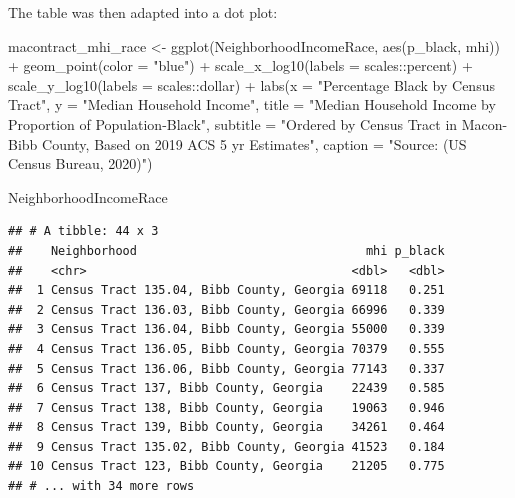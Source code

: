 \documentclass[
]{article}
\newenvironment{Shaded}{\begin{snugshade}}{\end{snugshade}}
\newcommand{\AttributeTok}[1]{\textcolor[rgb]{0.77,0.63,0.00}{#1}}
\newcommand{\FunctionTok}[1]{\textcolor[rgb]{0.00,0.00,0.00}{#1}}
\newcommand{\NormalTok}[1]{#1}
\newcommand{\OtherTok}[1]{\textcolor[rgb]{0.56,0.35,0.01}{#1}}
\newcommand{\SpecialCharTok}[1]{\textcolor[rgb]{0.00,0.00,0.00}{#1}}
\newcommand{\StringTok}[1]{\textcolor[rgb]{0.31,0.60,0.02}{#1}}
\begin{document}
The table was then adapted into a dot plot:

\begin{Shaded}
\begin{Highlighting}[]
\NormalTok{macontract\_mhi\_race }\OtherTok{\textless{}{-}} \FunctionTok{ggplot}\NormalTok{(NeighborhoodIncomeRace, }\FunctionTok{aes}\NormalTok{(p\_black, mhi)) }\SpecialCharTok{+} \FunctionTok{geom\_point}\NormalTok{(}\AttributeTok{color =} \StringTok{"blue"}\NormalTok{) }\SpecialCharTok{+} 
\FunctionTok{scale\_x\_log10}\NormalTok{(}\AttributeTok{labels =}\NormalTok{ scales}\SpecialCharTok{::}\NormalTok{percent) }\SpecialCharTok{+}
\FunctionTok{scale\_y\_log10}\NormalTok{(}\AttributeTok{labels =}\NormalTok{ scales}\SpecialCharTok{::}\NormalTok{dollar) }\SpecialCharTok{+} 
\FunctionTok{labs}\NormalTok{(}\AttributeTok{x =} \StringTok{"Percentage Black by Census Tract"}\NormalTok{, }\AttributeTok{y =} \StringTok{"Median Household Income"}\NormalTok{,}
     \AttributeTok{title =} \StringTok{"Median Household Income by Proportion of Population{-}Black"}\NormalTok{,}
     \AttributeTok{subtitle =}  \StringTok{"Ordered by Census Tract in Macon{-}Bibb County, Based on 2019 ACS 5 yr Estimates"}\NormalTok{,}
     \AttributeTok{caption =} \StringTok{"Source: (US Census Bureau, 2020)"}\NormalTok{)}
\end{Highlighting}
\end{Shaded}

\begin{Shaded}
\begin{Highlighting}[]
\NormalTok{NeighborhoodIncomeRace}
\end{Highlighting}
\end{Shaded}

\begin{verbatim}
## # A tibble: 44 x 3
##    Neighborhood                                mhi p_black
##    <chr>                                     <dbl>   <dbl>
##  1 Census Tract 135.04, Bibb County, Georgia 69118   0.251
##  2 Census Tract 136.03, Bibb County, Georgia 66996   0.339
##  3 Census Tract 136.04, Bibb County, Georgia 55000   0.339
##  4 Census Tract 136.05, Bibb County, Georgia 70379   0.555
##  5 Census Tract 136.06, Bibb County, Georgia 77143   0.337
##  6 Census Tract 137, Bibb County, Georgia    22439   0.585
##  7 Census Tract 138, Bibb County, Georgia    19063   0.946
##  8 Census Tract 139, Bibb County, Georgia    34261   0.464
##  9 Census Tract 135.02, Bibb County, Georgia 41523   0.184
## 10 Census Tract 123, Bibb County, Georgia    21205   0.775
## # ... with 34 more rows
\end{verbatim}
\end{document}
